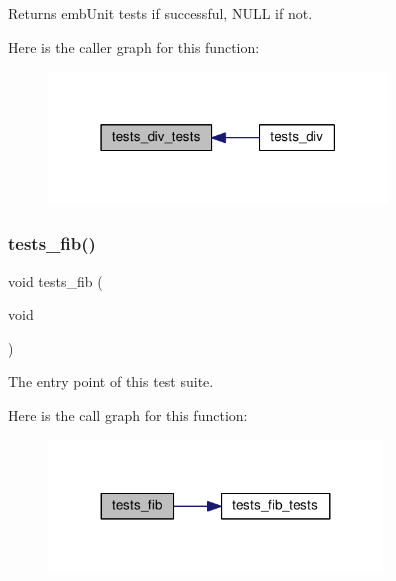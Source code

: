 \begin{DoxyReturn}{Returns}
emb\+Unit tests if successful, N\+U\+LL if not. 
\end{DoxyReturn}
Here is the caller graph for this function\+:
\nopagebreak
\begin{figure}[H]
\begin{center}
\leavevmode
\includegraphics[width=255pt]{group__unittests_ga8e77add06e39b1bb9dbf9004f2ea4c95_icgraph}
\end{center}
\end{figure}
\mbox{\label{group__unittests_ga278497a70466c93676af8839dbcfe05a}} 
\subsubsection{\texorpdfstring{tests\+\_\+fib()}{tests\_fib()}}
{\footnotesize\ttfamily void tests\+\_\+fib (\begin{DoxyParamCaption}\item[{void}]{ }\end{DoxyParamCaption})}



The entry point of this test suite. 

Here is the call graph for this function\+:
\nopagebreak
\begin{figure}[H]
\begin{center}
\leavevmode
\includegraphics[width=251pt]{group__unittests_ga278497a70466c93676af8839dbcfe05a_cgraph}
\end{center}
\end{figure}
\mbox{\label{group__unittests_ga81367a9f08a307f54d685b422cf97f3d}} 
